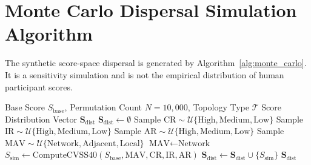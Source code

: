 \section{Monte Carlo Dispersal Simulation Algorithm}
\label{sec:monte_carlo_algo}
The synthetic score-space dispersal is generated by Algorithm~\ref{alg:monte_carlo}. It is a sensitivity simulation and is not the empirical distribution of human participant scores.

\begin{algorithm}[H]
\caption{Monte Carlo Scoring Dispersal Simulation}
\label{alg:monte_carlo}
\begin{algorithmic}[1]
\Require Base Score $S_{\text{base}}$, Permutation Count $N = 10,000$, Topology Type $\mathcal{T}$
\Ensure Score Distribution Vector $\mathbf{S}_{\text{dist}}$
\State $\mathbf{S}_{\text{dist}} \gets \emptyset$
    \State Sample $\text{CR} \sim \mathcal{U}\{\text{High}, \text{Medium}, \text{Low}\}$
    \State Sample $\text{IR} \sim \mathcal{U}\{\text{High}, \text{Medium}, \text{Low}\}$
    \State Sample $\text{AR} \sim \mathcal{U}\{\text{High}, \text{Medium}, \text{Low}\}$
        \State Sample $\text{MAV} \sim \mathcal{U}\{\text{Network}, \text{Adjacent}, \text{Local}\}$
    \Else
        \State $\text{MAV} \gets \text{Network}$
    \EndIf
    \State $S_{\text{sim}} \gets \text{ComputeCVSS40}(S_{\text{base}}, \text{MAV}, \text{CR}, \text{IR}, \text{AR})$
    \State $\mathbf{S}_{\text{dist}} \gets \mathbf{S}_{\text{dist}} \cup \{S_{\text{sim}}\}$
\EndFor
\State \Return $\mathbf{S}_{\text{dist}}$
\end{algorithmic}
\end{algorithm}
